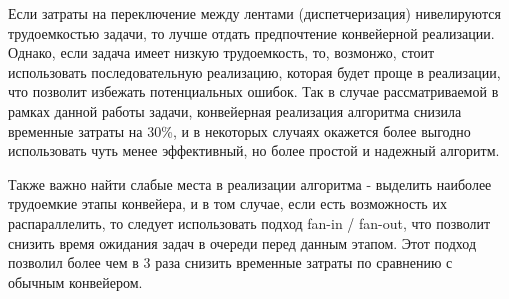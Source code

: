 Если затраты на переключение между лентами (диспетчеризация) нивелируются трудоемкостью
задачи, то лучше отдать предпочтение конвейерной реализации. Однако, если задача имеет низкую трудоемкость, 
то, возмонжо, стоит использовать последовательную реализацию, которая будет проще в реализации, что позволит
избежать потенциальных ошибок. Так в случае рассматриваемой в рамках данной работы задачи, конвейерная реализация
алгоритма снизила временные затраты на 30\%, и в некоторых случаях окажется более выгодно использовать чуть менее
эффективный, но более простой и надежный алгоритм.

Также важно найти слабые места в реализации алгоритма - выделить наиболее трудоемкие этапы конвейера, и в том случае, если
есть возможность их распараллелить, то следует использовать подход fan-in / fan-out, что позволит
снизить время ожидания задач в очереди перед данным этапом. Этот подход позволил более чем в 3 
раза снизить временные затраты по сравнению с обычным конвейером. 

